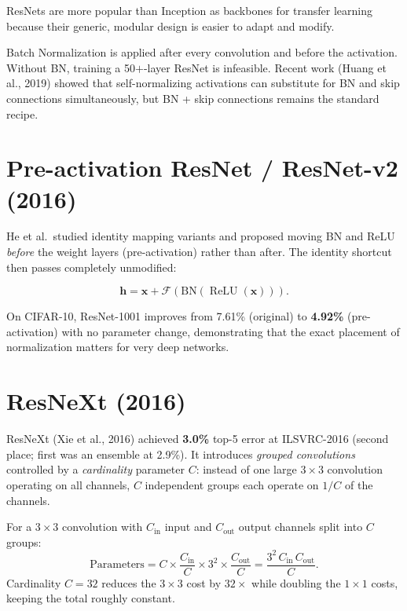 \documentclass[11pt, oneside]{book}
\newcommand{\xvec}{\mathbf{x}}
\newcommand{\hvec}{\mathbf{h}}
\DeclareMathOperator{\relu}{ReLU}
\begin{document}
ResNets are more popular than Inception as backbones for transfer learning
because their generic, modular design is easier to adapt and modify.

\begin{notebox}[title={Batch Normalization is Critical}]
Batch Normalization is applied after every convolution and before the activation.
Without BN, training a 50$+$-layer ResNet is infeasible.
Recent work (Huang et al., 2019) showed that self-normalizing activations can
substitute for BN and skip connections simultaneously, but BN + skip connections
remains the standard recipe.
\end{notebox}

\section{Pre-activation ResNet / ResNet-v2 (2016)}

He et al.\ studied identity mapping variants and proposed moving BN and ReLU
\emph{before} the weight layers (pre-activation) rather than after.
The identity shortcut then passes completely unmodified:

\[
  \hvec = \xvec + \mathcal{F}\!\left(\mathrm{BN}\!\left(\relu(\xvec)\right)\right).
\]

On CIFAR-10, ResNet-1001 improves from 7.61\% (original) to \textbf{4.92\%} (pre-activation)
with no parameter change, demonstrating that the exact placement of normalization
matters for very deep networks.

\section{ResNeXt (2016)}

ResNeXt (Xie et al., 2016) achieved \textbf{3.0\%} top-5 error at ILSVRC-2016
(second place; first was an ensemble at 2.9\%).
It introduces \emph{grouped convolutions} controlled by a \emph{cardinality} parameter $C$:
instead of one large $3\times3$ convolution operating on all channels,
$C$ independent groups each operate on $1/C$ of the channels.

\begin{thmbox}[title={Grouped Convolution Parameter Count}]
For a $3\times3$ convolution with $C_\mathrm{in}$ input and $C_\mathrm{out}$ output channels
split into $C$ groups:
\[
  \text{Parameters} = C \times \frac{C_\mathrm{in}}{C} \times 3^2 \times \frac{C_\mathrm{out}}{C}
  = \frac{3^2\, C_\mathrm{in}\, C_\mathrm{out}}{C}.
\]
Cardinality $C=32$ reduces the $3\times3$ cost by $32\times$ while
doubling the $1\times1$ costs, keeping the total roughly constant.
\end{thmbox}
\end{document}
